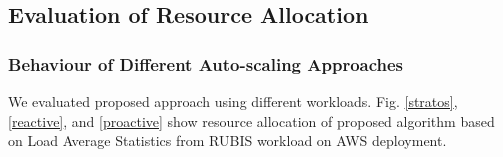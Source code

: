 \subsection{Evaluation of Resource Allocation}
\subsubsection{Behaviour of Different Auto-scaling Approaches}
We evaluated proposed approach using different workloads. Fig. \ref{stratos}, \ref{reactive}, and \ref{proactive} show resource allocation of proposed algorithm based on Load Average Statistics from RUBIS workload on AWS deployment.
